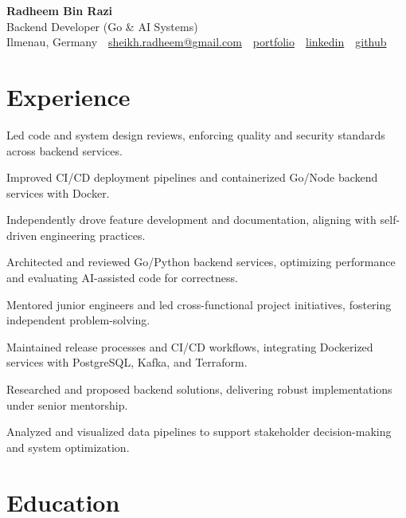 \documentclass[11pt,a4paper]{resume}
\makeatletter
\newcommand{\Portfolio}{https://radheem.github.io/my-cv}
\newcommand{\PortfolioText}{portfolio}
\newcommand{\GitHub}{https://github.com/radheem}
\newcommand{\LinkedIn}{https://www.linkedin.com/in/radheem-razi}
\newcommand{\Email}{sheikh.radheem@gmail.com}
\makeatother
\begin{document}
\begin{center}
  {\huge\bfseries Radheem Bin Razi}\\[3pt]
  {\large Backend Developer (Go \& AI Systems)}\\[6pt]
  \small
  Ilmenau, Germany \,\textbar\,
  \href{mailto:\Email}{\Email} \,\textbar\,
  \href{\Portfolio}{\PortfolioText} \,\textbar\,
  \href{\LinkedIn}{linkedin} \,\textbar\,
  \href{\GitHub}{github}
\end{center}
\vspace{2pt}

\section{Experience}

\bullets
  \item Led code and system design reviews, enforcing quality and security standards across backend services.
  \item Improved CI/CD deployment pipelines and containerized Go/Node backend services with Docker.
  \item Independently drove feature development and documentation, aligning with self-driven engineering practices.
\bulletsend
\vspace{3pt}
\bullets
  \item Architected and reviewed Go/Python backend services, optimizing performance and evaluating AI-assisted code for correctness.
  \item Mentored junior engineers and led cross-functional project initiatives, fostering independent problem-solving.
  \item Maintained release processes and CI/CD workflows, integrating Dockerized services with PostgreSQL, Kafka, and Terraform.
\bulletsend
\vspace{3pt}
\bullets
  \item Researched and proposed backend solutions, delivering robust implementations under senior mentorship.
  \item Analyzed and visualized data pipelines to support stakeholder decision-making and system optimization.
\bulletsend
\vspace{3pt}

\section{Education}
\end{document}
